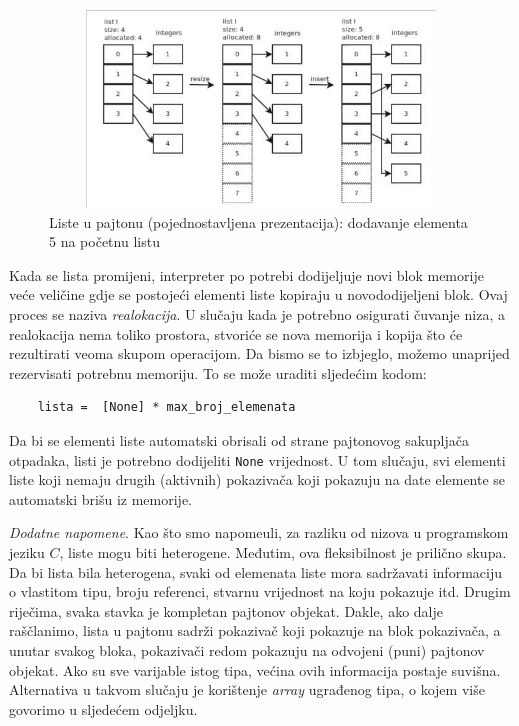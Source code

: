 \begin{figure}[!ht]
	\centering
	\includegraphics[width=320pt,height=150pt]{slike/list_mem_management.png}
	\caption{Liste u pajtonu (pojednostavljena prezentacija): dodavanje elementa 5 na početnu listu} 
\end{figure}%


 Kada se lista promijeni, interpreter po potrebi dodijeljuje novi blok memorije veće veličine gdje se postojeći elementi liste kopiraju u novododijeljeni blok. Ovaj proces se naziva \textit{realokacija}.  U slučaju kada je potrebno osigurati čuvanje niza, a realokacija nema toliko prostora, stvoriće se nova memorija i kopija što će rezultirati veoma skupom operacijom. Da bismo se to izbjeglo, možemo unaprijed rezervisati potrebnu memoriju. To se može uraditi sljedećim kodom:
 \begin{verbatim}
    lista =  [None] * max_broj_elemenata
 \end{verbatim}

Da bi se elementi liste automatski obrisali od strane pajtonovog sakupljača otpadaka, listi je potrebno dodijeliti \texttt{None} vrijednost.  U tom slučaju, svi elementi liste koji nemaju drugih (aktivnih) pokazivača koji pokazuju na date elemente se automatski brišu iz memorije. 

\textit{Dodatne napomene}. Kao što smo napomeuli, za razliku od nizova u programskom jeziku $C$, liste mogu biti heterogene. Međutim, ova fleksibilnost je prilično skupa. Da bi lista bila heterogena, svaki od elemenata liste mora sadržavati informaciju o vlastitom tipu, broju referenci, stvarnu vrijednost na koju pokazuje itd. Drugim riječima, svaka stavka je kompletan pajtonov objekat. Dakle, ako   dalje raščlanimo, lista u pajtonu sadrži pokazivač koji   pokazuje na   blok pokazivača, a unutar svakog bloka,  pokazivači redom pokazuju na odvojeni (puni) pajtonov objekat.  Ako su sve varijable istog tipa, većina ovih informacija postaje suvišna. Alternativa u takvom slučaju je korištenje \textit{array} ugrađenog tipa, o kojem više govorimo u sljedećem odjeljku.   %

